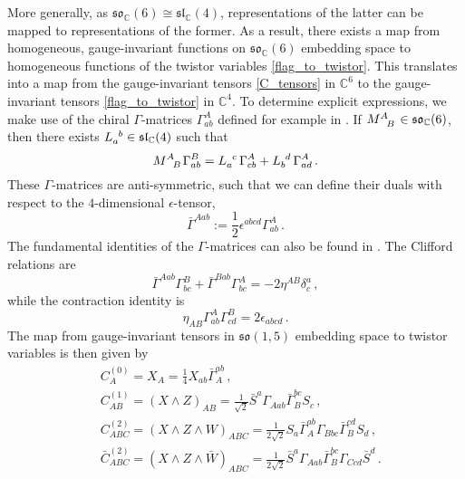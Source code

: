 \documentclass{article}
\def \dg {\delta}
\def \Cs {\mathbb{C}}
\begin{document}
More generally, as $\mathfrak{so}_{\Cs}(6) \cong \mathfrak{sl}_{\Cs}(4)$, representations of the latter can be mapped to representations of the former. As a result, there exists a map from homogeneous, gauge-invariant functions on $\mathfrak{so}_{\Cs}(6)$ embedding space to homogeneous functions of the twistor variables \eqref{flag_to_twistor}. This translates into a map from the gauge-invariant tensors \eqref{C_tensors} in $\Cs^6$ to the gauge-invariant tensors \eqref{flag_to_twistor} in $\Cs^4$. To determine explicit expressions, we make use of the chiral $\Gamma$-matrices $\Gamma^A_{ab}$ defined for example in \cite[Appendix~B]{SimmonsDuffin:2012uy}. If $\tensor{M}{^A_B}\in \mathfrak{so}_{\Cs}(6)$, then there exists $\tensor{L}{_a^b} \in \mathfrak{sl}_{\Cs}(4)$ such that 
\begin{equation}
    \tensor{M}{^A_B} \Gamma^B_{ab} = \tensor{L}{_a^c}\, \Gamma^A_{cb} + \tensor{L}{_b^d}\, \Gamma^A_{ad}\,. 
\end{equation}
These $\Gamma$-matrices are anti-symmetric, such that we can define their duals with respect to the $4$-dimensional $\epsilon$-tensor,
\begin{equation}
\bar{\Gamma}^{Aab} := \frac{1}{2} \epsilon^{abcd} \Gamma^A_{ab}\,. 
\end{equation}
The fundamental identities of the $\Gamma$-matrices can also be found in \cite[Appendix~B]{SimmonsDuffin:2012uy}. The Clifford relations are
\begin{equation}
    \bar{\Gamma}^{A ab} \Gamma^{B}_{bc} +  \bar{\Gamma}^{B ab} \Gamma^{A}_{bc}  = -2 \eta^{AB} \dg_c^a\,,
\end{equation}
while the contraction identity is
\begin{equation}
\eta_{AB} \Gamma^A_{ab}\Gamma^B_{cd}=2 \epsilon_{abcd}\,.
\end{equation}
The map from gauge-invariant tensors in $\mathfrak{so}(1,5)$ embedding space to twistor variables is then given by
\begin{align}
& C^{(0)}_A = X_A = \frac{1}{4} X_{ab} \bar{\Gamma}_A^{ab}\,, \\
& C^{(1)}_{AB} = (X\wedge Z)_{AB} = \frac{1}{\sqrt{2}} \bar{S}^a \Gamma_{Aab} \bar{\Gamma}_B^{bc} S_c\,, \\
& C^{(2)}_{ABC} = (X\wedge Z \wedge W)_{ABC} =\frac{1}{2 \sqrt{2}}  S_a \bar{\Gamma}_A^{ab} \Gamma_{Bbc} \bar{\Gamma}_B^{cd} S_d\,,  \\
& \bar{C}^{(2)}_{ABC} =(X\wedge Z \wedge \bar{W})_{ABC} =\frac{1}{2 \sqrt{2}}  \bar{S}^a \Gamma_{Aab} \bar{\Gamma}_{B}^{bc} \Gamma_{Ccd} \bar{S}^d\,. 
\end{align}
\end{document}
